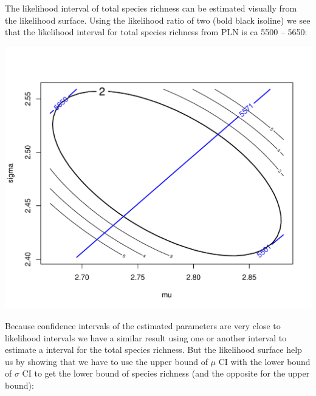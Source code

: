 \documentclass[12pt, A4]{article}\usepackage[]{graphicx}\usepackage[]{color}
\makeatletter
\def\maxwidth{ %
  \ifdim\Gin@nat@width>\linewidth
    \linewidth
  \else
    \Gin@nat@width
  \fi
}
\newenvironment{knitrout}{}{} %
\makeatother
\begin{document}
The likelihood interval of total species richness can be estimated
visually from the likelihood surface. 
Using the likelihood ratio of two (bold black isoline)
we see that the likelihood interval for total species richness from PLN is
ca 5500 -- 5650:

\begin{knitrout}
\color{fgcolor}

{\centering \includegraphics[width=\maxwidth]{figure/PLN_richness_ci-1} 

}



\end{knitrout}

Because confidence intervals of the estimated parameters are very close to likelihood intervals 
we have a similar result using one or another interval to estimate a interval for the total species richness. 
But the likelihood surface help us by showing 
that we have to use the upper bound of $\mu$ CI with the lower bound of $\sigma$ CI
to get the lower bound of species richness (and the opposite for the
upper bound):
\end{document}
